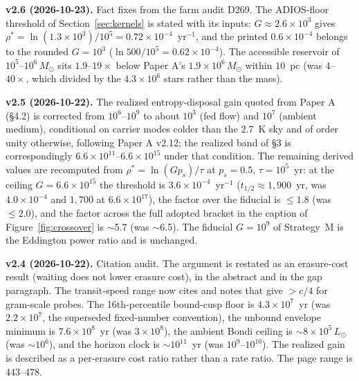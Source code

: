 \documentclass[11pt]{article}
\newcommand{\msun}{\ensuremath{M_\odot}}
\begin{document}
\textbf{v2.6 (2026-10-23).} Fact fixes from the farm audit D269. The ADIOS-floor threshold of Section~\ref{sec:kernels} is stated with its inputs: $G \approx 2.6\times10^{3}$ gives $\rho^{*} = \ln(1.3\times10^{3})/10^{5} = 0.72\times10^{-4}$~yr$^{-1}$, and the printed $0.6\times10^{-4}$ belongs to the rounded $G = 10^{3}$ ($\ln 500/10^{5} = 0.62\times10^{-4}$). The accessible reservoir of $10^{5}$--$10^{6}\,\msun$ sits $1.9$--$19\times$ below Paper A's $1.9\times10^{6}\,\msun$ within $10$~pc (was $4$--$40\times$, which divided by the $4.3\times10^{6}$ stars rather than the mass).

\textbf{v2.5 (2026-10-22).} The realized entropy-disposal gain quoted from Paper A (\S4.2) is corrected from $10^{6}$--$10^{9}$ to about $10^{3}$ (fed flow) and $10^{7}$ (ambient medium), conditional on carrier modes colder than the 2.7~K sky and of order unity otherwise, following Paper A v2.12; the realized band of \S3 is correspondingly $6.6\times10^{11}$--$6.6\times10^{15}$ under that condition. The remaining derived values are recomputed from $\rho^{*} = \ln(G p_{s})/\tau$ at $p_{s} = 0.5$, $\tau = 10^{5}$~yr: at the ceiling $G = 6.6\times10^{15}$ the threshold is $3.6\times10^{-4}$~yr$^{-1}$ ($t_{1/2} \approx 1{,}900$~yr, was $4.0\times10^{-4}$ and $1{,}700$ at $6.6\times10^{17}$), the factor over the fiducial is $\leq 1.8$ (was $\leq 2.0$), and the factor across the full adopted bracket in the caption of Figure~\ref{fig:crossover} is $\sim$5.7 (was $\sim$6.5). The fiducial $G = 10^{9}$ of Strategy~M is the Eddington power ratio and is unchanged.

\textbf{v2.4 (2026-10-22).} Citation audit. The \citet{Bennett2019} argument is restated as an erasure-cost result (waiting does not lower erasure cost), in the abstract and in the gap paragraph. The transit-speed range now cites \citet{Hoang2017} and notes that \citet{Lubin2016} give $>c/4$ for gram-scale probes. The 16th-percentile bound-cusp floor is $4.3\times10^{7}$~yr (was $2.2\times10^{7}$, the superseded fixed-number convention), the unbound envelope minimum is $7.6\times10^{8}$~yr (was $3\times10^{8}$), the ambient Bondi ceiling is $\sim8\times10^{5}\,L_\odot$ (was $\sim10^{6}$), and the \citet{Hooper2018} horizon clock is $\sim10^{11}$~yr (was $10^{9}$--$10^{10}$). The realized gain is described as a per-erasure cost ratio rather than a rate ratio. The \citet{Laibson1997} page range is 443--478.



\end{document}
